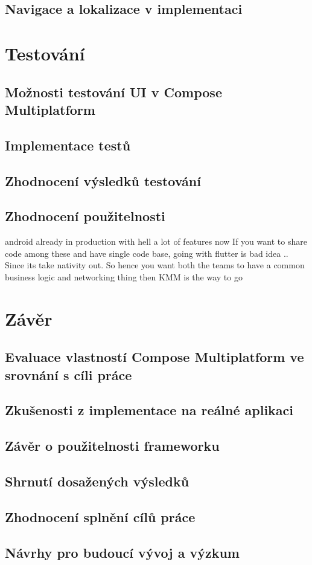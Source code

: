 \section{Navigace a lokalizace v implementaci}

\chapter{Testování}

\section{Možnosti testování UI v Compose Multiplatform}
\section{Implementace testů}
\section{Zhodnocení výsledků testování}

\section{Zhodnocení použitelnosti}

android already in production with hell a lot of features now If you want to share code among these and have single code base, going with flutter is bad idea .. Since its take nativity out. So hence you want both the teams to have a common business logic and networking thing then KMM is the way to go 

\chapter{Závěr}

\section{Evaluace vlastností Compose Multiplatform ve srovnání s cíli práce}
\section{Zkušenosti z implementace na reálné aplikaci}
\section{Závěr o použitelnosti frameworku}

\section{Shrnutí dosažených výsledků}
\section{Zhodnocení splnění cílů práce}
\section{Návrhy pro budoucí vývoj a výzkum}


